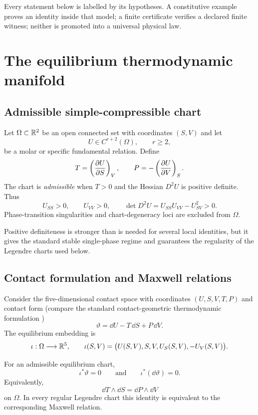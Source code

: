 \begin{principle}
Every statement below is labelled by its hypotheses.  A constitutive example proves an identity inside that model; a finite certificate verifies a declared finite witness; neither is promoted into a universal physical law.
\end{principle}

\section{The equilibrium thermodynamic manifold}

\subsection{Admissible simple-compressible chart}

\begin{definition}
Let $\Omega\subset\mathbb R^2$ be an open connected set with coordinates $(S,V)$ and let
\[
U\in C^{r+2}(\Omega),\qquad r\ge2,
\]
be a molar or specific fundamental relation.  Define
\[
T=\left(\frac{\partial U}{\partial S}\right)_{V},\qquad P=-\left(\frac{\partial U}{\partial V}\right)_{S}.
\]
The chart is \emph{admissible} when $T>0$ and the Hessian $D^2U$ is positive definite.  Thus
\[
U_{SS}>0,\qquad U_{VV}>0,\qquad
\det D^2U=U_{SS}U_{VV}-U_{SV}^2>0.
\]
Phase-transition singularities and chart-degeneracy loci are excluded from $\Omega$.
\end{definition}

Positive definiteness is stronger than is needed for several local identities, but it gives the standard stable single-phase regime and guarantees the regularity of the Legendre charts used below.

\subsection{Contact formulation and Maxwell relations}

Consider the five-dimensional contact space with coordinates $(U,S,V,T,P)$ and contact form (compare the standard contact-geometric thermodynamic formulation \cite{Mrugala1978})
\[
\vartheta=\dd U-T\,\dd S+P\,\dd V.
\]
The equilibrium embedding is
\[
\iota:\Omega\longrightarrow\mathbb R^5,
\qquad
\iota(S,V)=\bigl(U(S,V),S,V,U_S(S,V),-U_V(S,V)\bigr).
\]

\begin{theorem}
For an admissible equilibrium chart,
\[
\iota^*\vartheta=0
\qquad\text{and}\qquad
\iota^*(\dd\vartheta)=0.
\]
Equivalently,
\begin{equation}
\dd T\wedge\dd S=\dd P\wedge\dd V
\label{eq:fundamental-two-form}
\end{equation}
on $\Omega$.  In every regular Legendre chart this identity is equivalent to the corresponding Maxwell relation.
\end{theorem}

